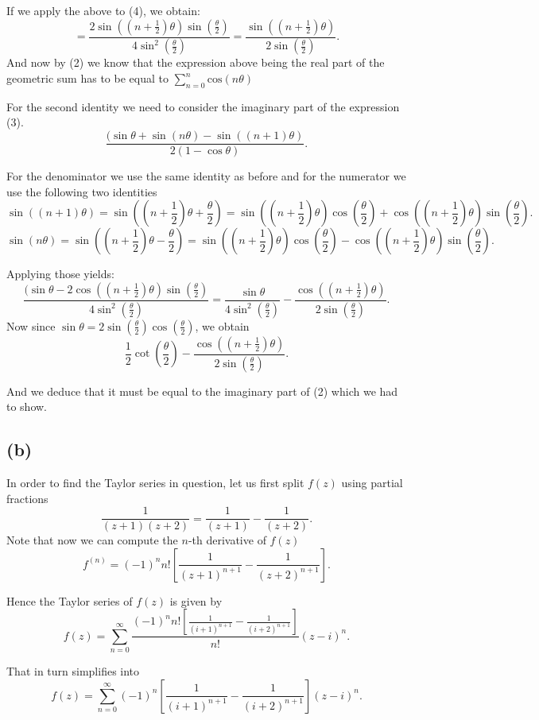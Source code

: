 \documentclass[12pt]{article}
\begin{document}
If we apply the above to (4), we obtain:
\[
	= \frac{2\sin(\left(n+\frac{1}{2}\right)\theta) \sin(\frac{\theta}{2})}{4\sin^2\left(\frac{\theta}{2}\right)} = 
	\frac{\sin(\left(n+\frac{1}{2}\right)\theta)}{2\sin\left(\frac{\theta}{2}\right)}
.\]
And now by (2) we know that the expression above being the real part of the geometric sum has to be equal to 
$\sum^{n}_{n = 0} \text{cos}(n\theta)$

For the second identity we need to consider the imaginary part of the expression (3).  
\[
	\frac{(\sin\theta + \sin(n\theta) - \sin((n+1)\theta)}{2(1 - \cos\theta)}
.\]

For the denominator we use the same identity as before and for the numerator we use the following two identities
\[
	\sin((n+1)\theta) = \sin(\left(n+\frac{1}{2}\right)\theta + \frac{\theta}{2}) = 
	\sin(\left(n+\frac{1}{2}\right)\theta) \cos(\frac{\theta}{2}) + \cos(\left(n+\frac{1}{2}\right)\theta) \sin(\frac{\theta}{2})  
.\]
\[
	\sin(n\theta) = \sin(\left(n+\frac{1}{2}\right)\theta - \frac{\theta}{2}) = 
	\sin(\left(n+\frac{1}{2}\right)\theta) \cos(\frac{\theta}{2}) - \cos(\left(n+\frac{1}{2}\right)\theta) \sin(\frac{\theta}{2})  
.\]

Applying those yields:
\[
	\frac{(\sin\theta  - 2\cos((n+\frac{1}{2})\theta)\sin(\frac{\theta}{2})}{4\sin^2(\frac{\theta}{2})} =
	\frac{\sin\theta}{4\sin^2(\frac{\theta}{2})} -\frac{\cos((n+\frac{1}{2})\theta)}{2\sin(\frac{\theta}{2})}
.\]
Now since $\sin\theta = 2\sin(\frac{\theta}{2})\cos(\frac{\theta}{2})$, we obtain
\[
	\frac{1}{2}\cot(\frac{\theta}{2}) -\frac{\cos((n+\frac{1}{2})\theta)}{2\sin(\frac{\theta}{2})}
.\]

And we deduce that it must be equal to the imaginary part of (2) which we had to show.
\subsection*{(b)}
In order to find the Taylor series in question, let us first split $f(z)$ using partial fractions
\[
	\frac{1}{(z+1)(z+2)} = \frac{1}{(z+1)} - \frac{1}{(z+2)}
.\]
Note that now we can compute the $n$-th derivative of $f(z)$
 \[
	 f^{(n)} = (-1)^{n} n! \left[ \frac{1}{(z+1)^{n+1}} - \frac{1}{(z+2)^{n+1}} \right]
.\]

Hence the Taylor series of $f(z)$ is given by 
\[
	f(z) = \sum^{\infty}_{n=0} \frac{(-1)^{n} n! \left[ \frac{1}{(i+1)^{n+1}} - \frac{1}{(i+2)^{n+1}} \right]}{n!} (z - i)^{n}
.\]

That in turn simplifies into
\[
	f(z) = \sum^{\infty}_{n=0} (-1)^{n}\left[ \frac{1}{(i+1)^{n+1}} - \frac{1}{(i+2)^{n+1}} \right](z - i)^{n}
.\]
\end{document}

